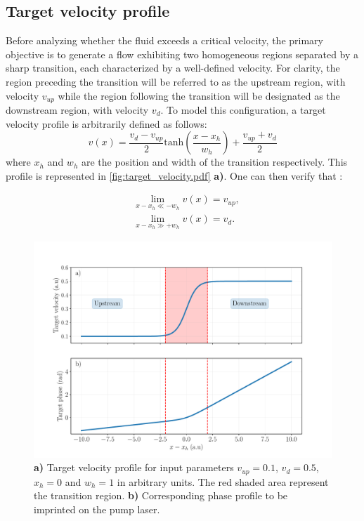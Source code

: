 \subsection{Target velocity profile}
Before analyzing whether the fluid exceeds a critical velocity, the primary objective is to generate a flow exhibiting two homogeneous regions separated by a sharp transition, each characterized by a well-defined velocity. For clarity, the region preceding the transition will be referred to as the upstream region, with velocity $v_{up}$ while the region following the transition will be designated as the downstream region, with velocity $v_{d}$.
To model this configuration, a target velocity profile is arbitrarily defined as follows:
\begin{equation}
    v(x)= \frac{v_{d}-v_{up}}{2}\mathrm{tanh}(\frac{x-x_h}{w_h})+\frac{v_{up}+v_{d}}{2}
    \label{eq:target_velocity}
\end{equation}
where $x_h$ and $w_h$ are the position and width of the transition respectively. This profile is represented in \autoref{fig:target_velocity.pdf} \textbf{a)}.
One can then verify that :

\begin{subequations}
    \begin{align}
    &\lim\limits_{x-x_h\ll-w_h} v(x) = v_{up},\\
    &\lim\limits_{x-x_h\gg+w_h} v(x) = v_{d}.
    \end{align}
\end{subequations}

\begin{figure}[h]
    \centering
    \includegraphics[width=1\textwidth]{chap_custom_st/fig/target_velocity.pdf}
    \caption{ \textbf{a)} Target velocity profile for input parameters $v_{up}=0.1$, $v_{d}=0.5$, $x_h=0$ and $w_h=1$ in arbitrary units. The red shaded area represent the 
    transition region. \textbf{b)} Corresponding phase profile to be imprinted on the pump laser.}
    \label{fig:target_velocity.pdf}
\end{figure}

